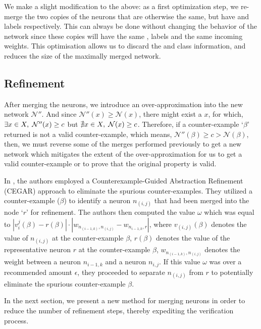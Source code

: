 We make a slight modification to the above: as a first optimization step, we
re-merge the two copies of the \abs neurons that are otherwise the same, but
have \posc and \negc labels respectively. This can always be done without
changing the behavior of the network since these copies will have the same \inc,
\dec labels and the same incoming weights.  This optimisation
allows us to discard the \posc and \negc class information, and reduces the size
of the maximally merged network.

\subsection{Refinement }



After merging the neurons, we introduce an over-approximation into 
the new network $\mathcal{N''}$. And since $\mathcal{N''}(x) \geq \mathcal{N}(x)$,
 there might exist a $x$, for which, $\exists x \in X, \hspace{1mm} \mathcal{N''}(x)
\geq c$ but $\nexists x \in X, \hspace{1mm} \mathcal{N}(x) \geq c$. 
Therefore, if a counter-example `$\beta$' returned is not a valid counter-example,
which means, $\mathcal{N''}(\beta) \geq c > \mathcal{N}(\beta)$, then, we must 
reverse some of the merges performed previously to get a new network which mitigates
the extent of the over-approximation for us to get a valid counter-example or to 
prove that the original property is valid.

In \cite{cegar-nn}, the authors employed a Counterexample-Guided Abstraction 
Refinement (CEGAR) approach to eliminate the spurious counter-examples. 
They utilized a counter-example ($\beta$) to identify a neuron $n_{(i, j)}$ 
that had been merged into the node `$r$' for refinement. The authors then 
computed the value $\omega$ which was equal to 
$|v_i^j(\beta) - r(\beta)| \cdot |w_{n_{(i-1, k)},n_{(i,j)}}-w_{n_{i-1,k},r}|$, 
where $v_{(i, j)}(\beta)$ denotes the value of $n_{(i, j)}$ at the 
counter-example $\beta$, $r(\beta)$ denotes the value of the 
representative neuron $r$ at the counter-example $\beta$, $w_{n_{(i-1,k)},n_{(i,j)}}$ 
denotes the weight between a neuron $n_{i-1,k}$ and a neuron $n_{i,j}$. 
If this value $\omega$ was over a recommended amount $\epsilon$, they proceeded to 
separate $n_{(i, j)}$ from $r$ to potentially eliminate the spurious counter-example 
$\beta$.



 In the next section, we present a new method for merging neurons in 
 order to reduce the number of refinement steps, thereby expediting the 
 verification process.
